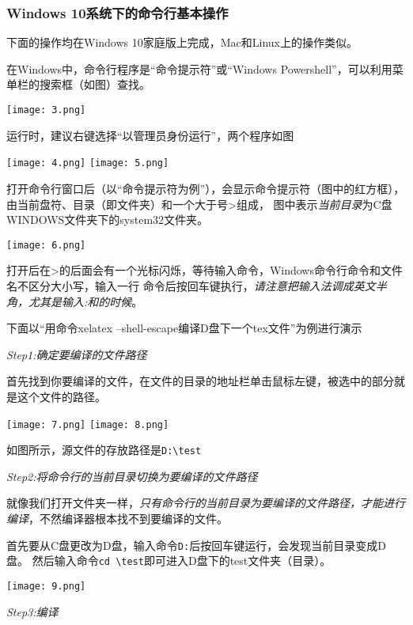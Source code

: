 \subsubsection{Windows 10系统下的命令行基本操作}\label{subsub:cz}


下面的操作均在Windows 10家庭版上完成，Mac和Linux上的操作类似。

在Windows中，命令行程序是“命令提示符”或“Windows Powershell”，可以利用菜单栏的搜索框（如图）查找。
\begin{center}
  \texttt{[image: 3.png]}
\end{center}运行时，建议右键选择“以管理员身份运行”，两个程序如图
\begin{center}
  \texttt{[image: 4.png]}
  \texttt{[image: 5.png]}
\end{center}

打开命令行窗口后（以“命令提示符为例”），会显示命令提示符（图中的红方框），由当前盘符、目录（即文件夹）和一个大于号>组成，
图中表示\emph{当前目录}为C盘WINDOWS文件夹下的system32文件夹。
\begin{center}
  \texttt{[image: 6.png]}
\end{center}
打开后在>的后面会有一个光标闪烁，等待输入命令，Windows命令行命令和文件名不区分大小写，输入一行
命令后按回车键执行，\emph{请注意把输入法调成英文半角，尤其是输入:和\texttt{}的时候}。

下面以“用命令xelatex --shell-escape编译D盘下一个tex文件”为例进行演示

\emph{Step1:确定要编译的文件路径}

  首先找到你要编译的文件，在文件的目录的地址栏单击鼠标左键，被选中的部分就是这个文件的路径。
\begin{center}
  \texttt{[image: 7.png]}
  \texttt{[image: 8.png]}
\end{center}
如图所示，源文件的存放路径是\verb"D:\test"

\emph{Step2:将命令行的当前目录切换为要编译的文件路径}

就像我们打开文件夹一样，\emph{只有命令行的当前目录为要编译的文件路径，才能进行编译}，不然编译器根本找不到要编译的文件。

首先要从C盘更改为D盘，输入命令\verb"D:"后按回车键运行，会发现当前目录变成D盘。
然后输入命令\verb"cd \test"即可进入D盘下的test文件夹（目录）。
\begin{center}
  \texttt{[image: 9.png]}
\end{center}

\emph{Step3:编译}

